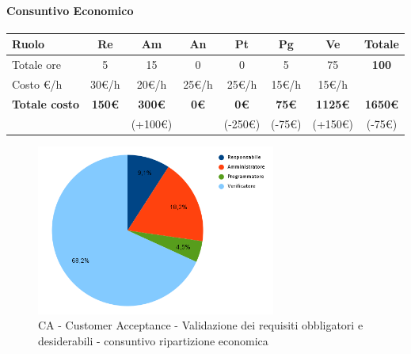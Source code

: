 \paragraph{Consuntivo Economico}
\begin{center}
	\renewcommand{\arraystretch}{1.8}
	\begin{tabular}{ |m{6em}|c|c|c|c|c|c|c| }
	\hline
	\textbf{Ruolo} & \textbf{Re} & \textbf{Am} &  \textbf{An} &  \textbf{Pt} &  \textbf{Pg} &  \textbf{Ve} &  \textbf{Totale}\\
    \hline
    Totale ore & 5 & 15 & 0 & 0 & 5 & 75 & \textbf{100}\\
    \hline
    Costo \euro/h & 30\euro/h & 20\euro/h & 25\euro/h & 25\euro/h & 15\euro/h & 15\euro/h & \\
    \hline
    \textbf{Totale costo} & \textbf{150\euro} & \textbf{300\euro} &  \textbf{0\euro} & \textbf{0\euro} &  \textbf{75\euro} &  \textbf{1125\euro} &  \textbf{1650\euro} \\
    &  & (+100\euro) &  & (-250\euro) & (-75\euro) & (+150\euro) & (-75\euro) \\
    \hline
	\end{tabular}

    \begin{figure}[H]
        \centering\includegraphics[width=0.7\textwidth, height=0.7\textheight, keepaspectratio]{images/consuntivo/CA-validazione-dei-requisiti-obbligatori-e-desiderabili-costo.png}
        \caption{CA - Customer Acceptance - Validazione dei requisiti obbligatori e desiderabili - consuntivo ripartizione economica}
    \end{figure}
\end{center}

